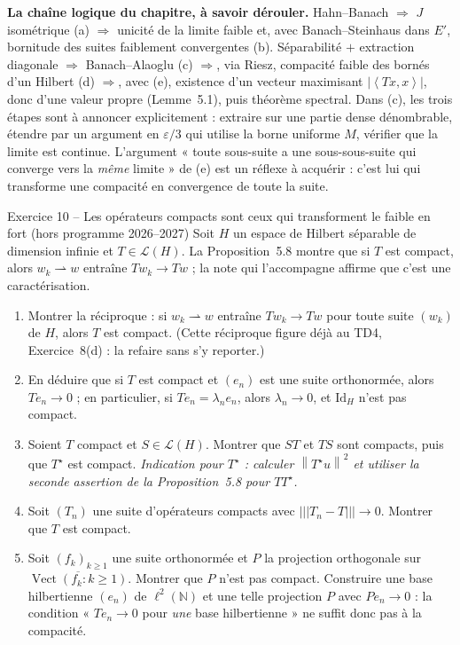 \documentclass[11pt,a4paper]{article}
\newcommand{\N}{\mathbb{N}}
\newcommand{\adh}[1]{\overline{#1}}
\newcommand{\Vect}{\operatorname{Vect}}
\newcommand{\norm}[1]{\left\|#1\right\|}
\newcommand{\opnorm}[1]{|\!|\!|#1|\!|\!|}
\newcommand{\ps}[2]{\left\langle #1,#2\right\rangle}
\newcommand{\Lc}{\mathcal{L}}
\newcommand{\wk}{\rightharpoonup}
\theoremstyle{definition}
\begin{document}
\begin{methode}
\textbf{La chaîne logique du chapitre, à savoir dérouler.} Hahn--Banach $\Rightarrow$ $J$ isométrique (a) $\Rightarrow$ unicité de la limite faible et, avec Banach--Steinhaus dans $E'$, bornitude des suites faiblement convergentes (b). Séparabilité $+$ extraction diagonale $\Rightarrow$ Banach--Alaoglu (c) $\Rightarrow$, via Riesz, compacité faible des bornés d'un Hilbert (d) $\Rightarrow$, avec (e), existence d'un vecteur maximisant $|\ps{Tx}x|$, donc d'une valeur propre (Lemme~5.1), puis théorème spectral. Dans (c), les trois étapes sont à annoncer explicitement : extraire sur une partie dense dénombrable, étendre par un argument en $\varepsilon/3$ qui utilise la borne uniforme $M$, vérifier que la limite est continue. L'argument « toute sous-suite a une sous-sous-suite qui converge vers la \emph{même} limite » de (e) est un réflexe à acquérir : c'est lui qui transforme une compacité en convergence de toute la suite.
\end{methode}


\begin{exo}{Exercice 10 -- Les opérateurs compacts sont ceux qui transforment le faible en fort (hors programme 2026--2027)}
Soit $H$ un espace de Hilbert séparable de dimension infinie et $T\in\Lc(H)$. La Proposition~5.8 montre que si $T$ est compact, alors $w_k\wk w$ entraîne $Tw_k\to Tw$ ; la note qui l'accompagne affirme que c'est une caractérisation.
\begin{enumerate}[label=(\alph*)]
  \item Montrer la réciproque : si $w_k\wk w$ entraîne $Tw_k\to Tw$ pour toute suite $(w_k)$ de $H$, alors $T$ est compact. (Cette réciproque figure déjà au TD4, Exercice~8(d) : la refaire sans s'y reporter.)
  \item En déduire que si $T$ est compact et $(e_n)$ est une suite orthonormée, alors $Te_n\to0$ ; en particulier, si $Te_n=\lambda_ne_n$, alors $\lambda_n\to0$, et $\mathrm{Id}_H$ n'est pas compact.
  \item Soient $T$ compact et $S\in\Lc(H)$. Montrer que $ST$ et $TS$ sont compacts, puis que $T^\star$ est compact. \emph{Indication pour $T^\star$ : calculer $\norm{T^\star u}^2$ et utiliser la seconde assertion de la Proposition~5.8 pour $TT^\star$.}
  \item Soit $(T_n)$ une suite d'opérateurs compacts avec $\opnorm{T_n-T}\to0$. Montrer que $T$ est compact.
  \item Soit $(f_k)_{k\ge1}$ une suite orthonormée et $P$ la projection orthogonale sur $\adh{\Vect(f_k:k\ge1)}$. Montrer que $P$ n'est pas compact. Construire une base hilbertienne $(e_n)$ de $\ell^2(\N)$ et une telle projection $P$ avec $Pe_n\to0$ : la condition « $Te_n\to0$ pour \emph{une} base hilbertienne » ne suffit donc pas à la compacité.
\end{enumerate}
\end{exo}
\end{document}

